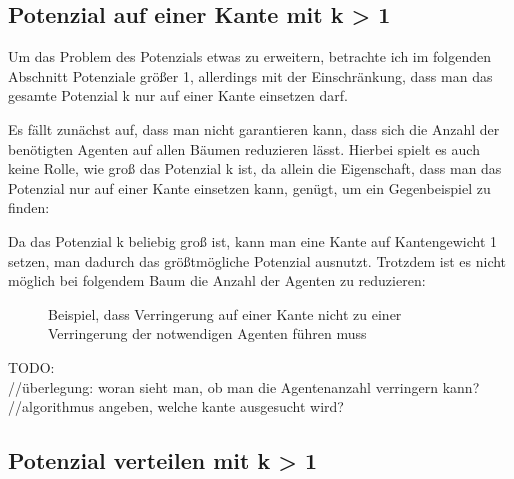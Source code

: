 \subsection{Potenzial auf einer Kante mit k > 1}

Um das Problem des Potenzials etwas zu erweitern, betrachte ich im folgenden Abschnitt Potenziale größer 1, allerdings mit der Einschränkung, dass man das gesamte Potenzial k nur auf einer Kante einsetzen darf.

Es fällt zunächst auf, dass man nicht garantieren kann, dass sich die Anzahl der benötigten Agenten auf allen Bäumen reduzieren lässt. Hierbei spielt es auch keine Rolle, wie groß das Potenzial k ist, da allein die Eigenschaft, dass man das Potenzial nur auf einer Kante einsetzen kann, genügt, um ein Gegenbeispiel zu finden:

Da das Potenzial k beliebig groß ist, kann man eine Kante auf Kantengewicht 1 setzen, man dadurch das größtmögliche Potenzial ausnutzt. Trotzdem ist es nicht möglich bei folgendem Baum die Anzahl der Agenten zu reduzieren:

\begin{figure}[h]
	\hfill
	\caption{Beispiel, dass Verringerung auf einer Kante nicht zu einer Verringerung der notwendigen Agenten führen muss} 
\end{figure} 

TODO:\\
//überlegung: woran sieht man, ob man die Agentenanzahl verringern kann?\\
//algorithmus angeben, welche kante ausgesucht wird?\\

\subsection{Potenzial verteilen mit k > 1}
